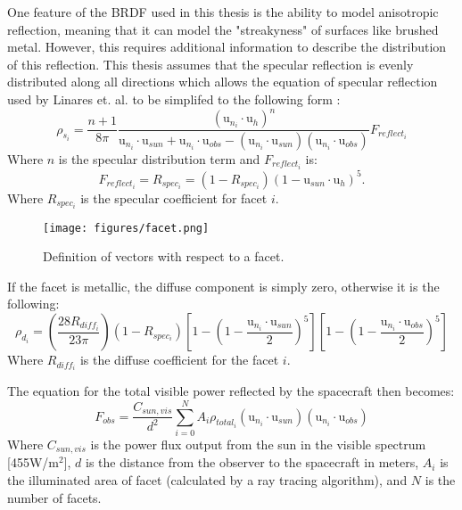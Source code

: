 One feature of the BRDF used in this thesis is the ability to model anisotropic reflection, meaning that it can model the "streakyness" of surfaces like brushed metal. However, this requires additional information to describe the distribution of this reflection. This thesis assumes that the specular reflection is evenly distributed along all directions which allows the equation of specular reflection used by Linares et. al. to be simplifed to the following form \cite{Linares_data_fusion}:
\begin{equation}
\rho_{s_i} = \frac{n + 1}{8\pi}
\frac{(\bm{\mathrm{u}}_{n_i}\cdotp \bm{\mathrm{u}}_h)^n}
{\bm{\mathrm{u}}_{n_i}\cdotp \bm{\mathrm{u}}_{sun} + \bm{\mathrm{u}}_{n_i}\cdotp \bm{\mathrm{u}}_{obs} - (\bm{\mathrm{u}}_{n_i}\cdotp \bm{\mathrm{u}}_{sun})(\bm{\mathrm{u}}_{n_i}\cdotp \bm{\mathrm{u}}_{obs})}F_{reflect_i}
\end{equation}
Where $n$ is the specular distribution term and $F_{reflect_i}$ is:
\begin{equation}
F_{reflect_i} = R_{spec_i} = (1 - R_{spec_i})(1 - \bm{\mathrm{u}}_{sun}\cdotp \bm{\mathrm{u}}_h)^5.
\end{equation}
Where $R_{spec_i}$ is the specular coefficient for facet $i$.

\begin{figure}[h!]
	\centering
	\texttt{[image: figures/facet.png]}
	\caption{Definition of vectors with respect to a facet.}
	\label{facet}
\end{figure}

If the facet is metallic, the diffuse component is simply zero, otherwise it is the following:
\begin{equation}
\rho_{d_i} = \left(\frac{28R_{diff_i}}{23\pi}\right)
(1 - R_{spec_i})
\left[1 - (1 - \frac{\bm{\mathrm{u}}_{n_i}\cdotp \bm{\mathrm{u}}_{sun}}{2})^5\right]
\left[1 - (1 - \frac{\bm{\mathrm{u}}_{n_i}\cdotp \bm{\mathrm{u}}_{obs}}{2})^5\right]
\end{equation}
Where $R_{diff_i}$ is the diffuse coefficient for the facet $i$.

The equation for the total visible power reflected by the spacecraft then becomes:
\begin{equation}
F_{obs} = \frac{C_{sun,vis}}{{d^2}}\sum_{i=0}^N A_i\rho_{total_i}(\bm{\mathrm{u}}_{n_i}\cdotp \bm{\mathrm{u}}_{sun})(\bm{\mathrm{u}}_{n_i}\cdotp \bm{\mathrm{u}}_{obs})
\end{equation}
Where $C_{sun,vis}$ is the power flux output from the sun in the visible spectrum [455W/m$^2$], $d$ is the distance from the observer to the spacecraft in meters, $A_i$ is the illuminated area of facet (calculated by a ray tracing algorithm), and $N$ is the number of facets.

